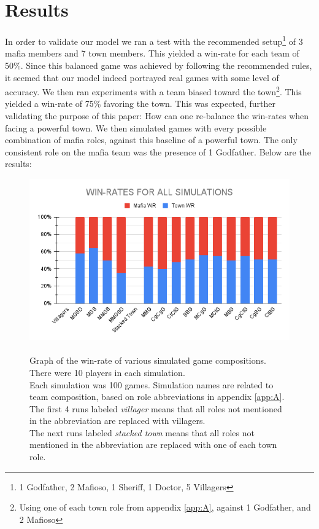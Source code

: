 \section{Results}\label{sec:results}
In order to validate our model we ran a test with the recommended 
setup\footnote[1]{1 Godfather, 2 Mafioso, 1 Sheriff, 1 Doctor, 5 Villagers} of 3
mafia members and 7 town members\cite{MafiaRules}. This yielded a win-rate for 
each team of 
50\%. Since this 
balanced game was achieved by following the recommended rules, it seemed that 
our model indeed portrayed real games with some level of accuracy. We then ran 
experiments with a team biased toward the town\footnote{Using one of each 
town 
role from appendix \ref{app:A}, against 1 Godfather, and 2 Mafioso}. This 
yielded a win-rate of 75\% favoring the town. This was expected, further 
validating the purpose of this paper: How can one re-balance the win-rates when 
facing a powerful town. We then simulated games with every possible combination 
of mafia roles, against this baseline of a powerful town. The only 
consistent role on the mafia team was the presence of 1 Godfather. Below are 
the results: 
\begin{figure}[h]
	\includegraphics[width=1\linewidth]{figures/Winrates}
	\caption{\\Graph of the win-rate of various simulated game compositions.\\ 
	There were 10 players in each simulation.\\ 
	Each simulation was 100 games. 
	Simulation names are related to team composition, based on role 
	abbreviations in appendix \ref{app:A}.\\ 
	The first 4 runs labeled \textit{villager} means that all roles not 
	mentioned in the abbreviation are replaced with villagers.\\ 
	The next runs labeled \textit{stacked town} means that all roles not 
	mentioned in the abbreviation are replaced with	one of each town role.}
	\label{fig:placeholder}
\end{figure}
